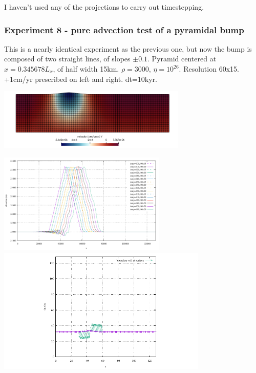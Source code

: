 I haven't used any of the projections to carry out timestepping.

\subsubsection*{Experiment 8 - pure advection test of a pyramidal bump}

This is a nearly identical experiment as the previous one, but now the bump is 
composed of two straight lines, of slopes $\pm 0.1$.
Pyramid centered at $x=0.345678L_x$, of half width 15km. $\rho=3000$, $\eta=10^{26}$.
Resolution 60x15. +1cm/yr prescribed on left and right. dt=10kyr. 

\begin{center}
\includegraphics[width=9cm]{python_codes/fieldstone_54/images/exp8/v}
\end{center}

\begin{center}
\includegraphics[width=8cm]{python_codes/fieldstone_54/images/exp8/surface.pdf}\\
\includegraphics[width=10cm]{python_codes/fieldstone_54/images/exp8/bc_vmesh.pdf}
\end{center}

